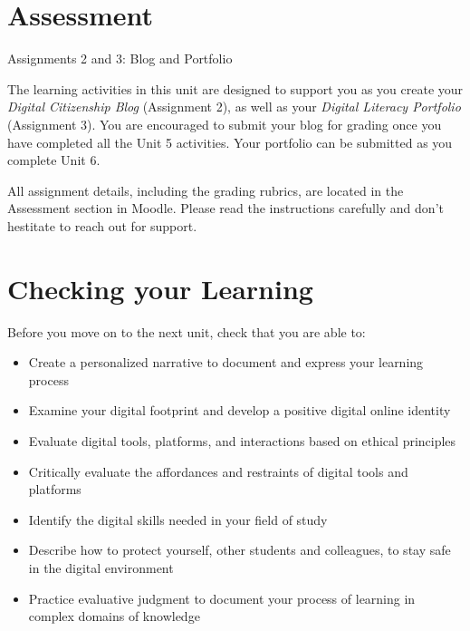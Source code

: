 \documentclass[
]{book}
\providecommand{\tightlist}{%
  \setlength{\itemsep}{0pt}\setlength{\parskip}{0pt}}
\theoremstyle{definition}
\theoremstyle{definition}
\theoremstyle{definition}
\theoremstyle{definition}
\theoremstyle{remark}
\begin{document}
\hypertarget{assessment-3}{%
\section*{Assessment}\label{assessment-3}}

\begin{assessment}
{Assignments 2 and 3: Blog and Portfolio}

The learning activities in this unit are designed to support you as you create your \emph{Digital Citizenship Blog} (Assignment 2), as well as your \emph{Digital Literacy Portfolio} (Assignment 3). You are encouraged to submit your blog for grading once you have completed all the Unit 5 activities. Your portfolio can be submitted as you complete Unit 6.

All assignment details, including the grading rubrics, are located in the Assessment section in Moodle. Please read the instructions carefully and don't hestitate to reach out for support.
\end{assessment}

\hypertarget{checking-your-learning-3}{%
\section*{Checking your Learning}\label{checking-your-learning-3}}

\begin{progress}
Before you move on to the next unit, check that you are able to:

\begin{itemize}
\tightlist
\item
  Create a personalized narrative to document and express your learning process\\
\item
  Examine your digital footprint and develop a positive digital online identity\\
\item
  Evaluate digital tools, platforms, and interactions based on ethical principles\\
\item
  Critically evaluate the affordances and restraints of digital tools and platforms\\
\item
  Identify the digital skills needed in your field of study\\
\item
  Describe how to protect yourself, other students and colleagues, to stay safe in the digital environment\\
\item
  Practice evaluative judgment to document your process of learning in complex domains of knowledge
\end{itemize}
\end{progress}
\end{document}
